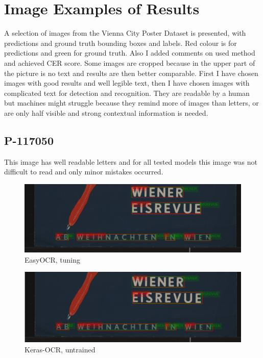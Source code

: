 \section*{Image Examples of Results}

A selection of images from the Vienna City Poster Dataset is presented, with predictions and ground truth bounding boxes and labels. Red colour is for predictions and green for ground truth. Also I added comments on used method and achieved CER score. Some images are cropped because in the upper part of the picture is no text and results are then better comparable. First I have chosen images with good results and well legible text, then I have chosen images with complicated text for detection and recognition. They are readable by a human but machines might struggle because they remind more of images than letters, or are only half visible and strong contextual information is needed. 


\subsection*{P-117050}
This image has well readable letters and for all tested models this image was not difficult to read and only minor mistakes occurred.

\begin{figure}[hbtp!]
    \centering
    \includegraphics[scale=0.36]{obrazky/plakaty/result_easyOCR_vienna1_split_tuning_special_sensitive-21.png}
    \caption{EasyOCR, tuning}
    \label{Im2:ex:easy}
\end{figure}

\begin{figure}[hbtp!]
    \centering
    \includegraphics[scale=0.36]{obrazky/plakaty/result_kerasOCR_vienna1_nosplit_nocorrection-21.png}
    \caption{Keras-OCR, untrained}
    \label{Im2:ex:keras}
\end{figure}

